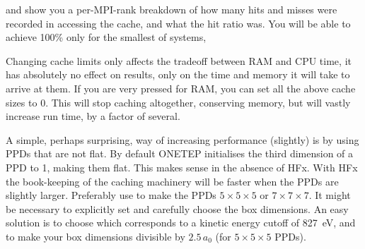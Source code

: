 \documentclass[letterpaper,10pt,english]{sphinxmanual}
\begin{document}
\begin{sphinxVerbatim}[commandchars=\\\{\}]
 
\end{sphinxVerbatim}

and show you a per-MPI-rank breakdown of how many hits and misses were
recorded in accessing the cache, and what the hit ratio was. You will be
able to achieve 100\% only for the smallest of systems,

Changing cache limits only affects the tradeoff between RAM and CPU
time, it has absolutely no effect on results, only on the time and
memory it will take to arrive at them. If you are very pressed for RAM,
you can set all the above cache sizes to 0. This will stop caching
altogether, conserving memory, but will vastly increase run time, by a
factor of several.

A simple, perhaps surprising, way of increasing performance (slightly)
is by using PPDs that are not flat. By default ONETEP initialises the
third dimension of a PPD to 1, making them flat. This makes sense in the
absence of HFx. With HFx the book-keeping of the caching machinery will
be faster when the PPDs are slightly larger. Preferably use
 to make the PPDs \(5\times{}5\times{}5\) or
\(7\times{}7\times{}7\). It might be necessary to explicitly set
 and carefully choose the box dimensions. An easy
solution is to choose  which corresponds to
a kinetic energy cutoff of 827 eV, and to make your box dimensions
divisible by \(2.5\,a_0\) (for \(5\times{}5\times{}5\) PPDs).
\end{document}

